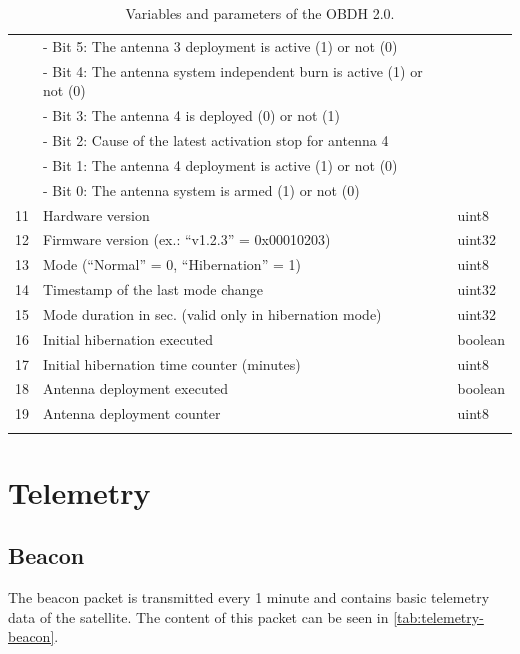 \begin{longtable}[c]{cL{0.82\textwidth}l}
        & - Bit 5: The antenna 3 deployment is active (1) or not (0) &     \\
        & - Bit 4: The antenna system independent burn is active (1) or not (0) & \\
        & - Bit 3: The antenna 4 is deployed (0) or not (1)       &        \\
        & - Bit 2: Cause of the latest activation stop for antenna 4 &     \\
        & - Bit 1: The antenna 4 deployment is active (1) or not (0) &     \\
        & - Bit 0: The antenna system is armed (1) or not (0)     &        \\
    11  & Hardware version                                        & uint8 \\
    12  & Firmware version (ex.: ``v1.2.3'' = 0x00010203)         & uint32 \\
    13  & Mode (``Normal'' = 0, ``Hibernation'' = 1)              & uint8 \\
    14  & Timestamp of the last mode change                       & uint32 \\
    15  & Mode duration in sec. (valid only in hibernation mode)  & uint32 \\
    16  & Initial hibernation executed                            & boolean \\
    17  & Initial hibernation time counter (minutes)              & uint8 \\
    18  & Antenna deployment executed                             & boolean \\
    19  & Antenna deployment counter                              & uint8 \\
    \bottomrule[1.5pt]
    \caption{Variables and parameters of the OBDH 2.0.}
    \label{tab:vars-and-pars}
\end{longtable}

\section{Telemetry}


\subsection{Beacon}

The beacon packet is transmitted every 1 minute and contains basic telemetry data of the satellite. The content of this packet can be seen in \autoref{tab:telemetry-beacon}.

